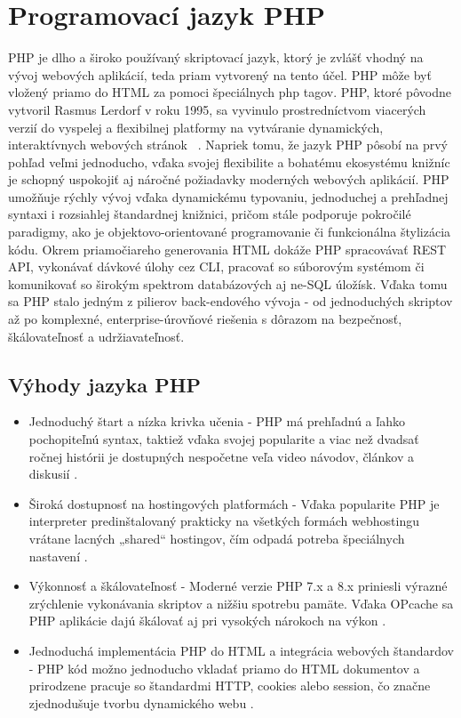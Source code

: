 \section {Programovací jazyk PHP}
PHP je dlho a široko používaný skriptovací jazyk, ktorý je zvlášť vhodný na vývoj webových aplikácií, teda priam vytvorený
na tento účel. PHP môže byť vložený priamo do HTML za pomoci špeciálnych php tagov. PHP, ktoré pôvodne vytvoril Rasmus 
Lerdorf v roku 1995, sa vyvinulo prostredníctvom viacerých verzií do vyspelej a flexibilnej platformy na vytváranie dynamických, 
interaktívnych webových stránok ~\cite{sklar2004learningphp5}. Napriek tomu, že jazyk PHP pôsobí na prvý pohľad veľmi jednoducho, 
vďaka svojej flexibilite a bohatému ekosystému knižníc je schopný uspokojiť aj náročné požiadavky moderných webových aplikácií. 
PHP umožňuje rýchly vývoj vďaka dynamickému typovaniu, jednoduchej a prehľadnej syntaxi i rozsiahlej štandardnej knižnici, 
pričom stále podporuje pokročilé paradigmy, ako je objektovo-orientované programovanie či funkcionálna štylizácia kódu. Okrem 
priamočiareho generovania HTML dokáže PHP spracovávať REST API, vykonávať dávkové úlohy cez CLI, pracovať so súborovým systémom 
či komunikovať so širokým spektrom databázových aj ne-SQL úložísk. Vďaka tomu sa PHP stalo jedným z pilierov back-endového 
vývoja - od jednoduchých skriptov až po komplexné, enterprise-úrovňové riešenia s dôrazom na bezpečnosť, škálovateľnosť a 
udržiavateľnosť.

\subsection {Výhody jazyka PHP}

\begin{itemize}
  \item Jednoduchý štart a nízka krivka učenia - PHP má prehľadnú a ľahko pochopiteľnú syntax, taktiež vďaka svojej
  popularite a viac než dvadsať ročnej histórii je dostupných nespočetne veľa video návodov, článkov a diskusií \cite{php_manual}.
  
  \item Široká dostupnosť na hostingových platformách - Vďaka popularite PHP je interpreter predinštalovaný 
  prakticky na všetkých formách webhostingu vrátane lacných „shared“ hostingov, čím odpadá potreba špeciálnych 
  nastavení \cite{php_manual}.

  \item Výkonnosť a škálovateľnosť - Moderné verzie PHP 7.x a 8.x priniesli výrazné zrýchlenie vykonávania skriptov a 
  nižšiu spotrebu pamäte. Vďaka OPcache sa PHP aplikácie dajú škálovať aj pri vysokých nárokoch na 
  výkon \cite{free_programming_books}.
  
  \item Jednoduchá implementácia PHP do HTML a integrácia webových štandardov - PHP kód možno jednoducho vkladať priamo do HTML dokumentov a 
  prirodzene pracuje so štandardmi HTTP, cookies alebo session, čo značne zjednodušuje tvorbu dynamického webu \cite{php_manual}.
\end{itemize}

